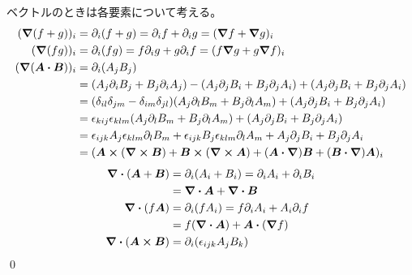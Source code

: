\documentclass[uplatex,dvipdfmx,a4paper,11pt]{jlreq}
\makeatletter
\newcommand{\rot}{\curl}
\theoremstyle{definition}
\renewenvironment{proof}[1][\proofname]{\par
  \normalfont
  \topsep6\p@\@plus6\p@ \trivlist
  \item[\hskip\labelsep{\bfseries #1}\@addpunct{\bfseries}]\ignorespaces\quad\par
}{%
  \qed\endtrivlist\@endpefalse
}
\renewcommand\proofname{証明}
\makeatother
\begin{document}
\begin{proof}
  ベクトルのときは各要素について考える。
  \begin{align}
    (\grad{(f+g)})_i               & = \partial_i(f+g) = \partial_i f + \partial_i g = (\grad{f} + \grad{g})_i                                                           \\
    (\grad{(fg)})_i                & = \partial_i(fg) = f\partial_i g + g\partial_i f = (f\grad{g} + g\grad{f})_i                                                        \\
    (\grad{(\bm{A}\vdot\bm{B})})_i & = \partial_i(A_jB_j)                                                                                                                \\
                                   & = (A_j\partial_iB_j + B_j\partial_iA_j) - (A_j\partial_jB_i + B_j\partial_jA_i) + (A_j\partial_jB_i + B_j\partial_jA_i)             \\
                                   & = (\delta_{il}\delta_{jm} - \delta_{im}\delta_{jl})(A_j\partial_lB_m + B_j\partial_lA_m) + (A_j\partial_jB_i + B_j\partial_jA_i)    \\
                                   & = \epsilon_{kij}\epsilon_{klm}(A_j\partial_lB_m + B_j\partial_lA_m) + (A_j\partial_jB_i + B_j\partial_jA_i)                         \\
                                   & = \epsilon_{ijk}A_j\epsilon_{klm}\partial_lB_m + \epsilon_{ijk}B_j\epsilon_{klm}\partial_lA_m + A_j\partial_jB_i + B_j\partial_jA_i \\
                                   & = (\bm{A}\cross(\rot{\bm{B}}) + \bm{B}\cross(\rot{\bm{A}}) + (\bm{A}\vdot\vnabla)\bm{B} + (\bm{B}\vdot\vnabla)\bm{A})_i
  \end{align}
  \begin{align}
    \div{(\bm{A}+\bm{B})}      & = \partial_i(A_i + B_i) = \partial_i A_i + \partial_i B_i         \\
                               & = \div{\bm{A}}+\div{\bm{B}}                                       \\
    \div{(f\bm{A})}            & = \partial_i(fA_i) = f\partial_iA_i + A_i\partial_if              \\
                               & = f(\div{\bm{A}}) + \bm{A}\vdot(\grad{f})                         \\
    \div{(\bm{A}\cross\bm{B})} & = \partial_i(\epsilon_{ijk}A_jB_k)                                \\

\end{align}
\end{proof}
\end{document}
